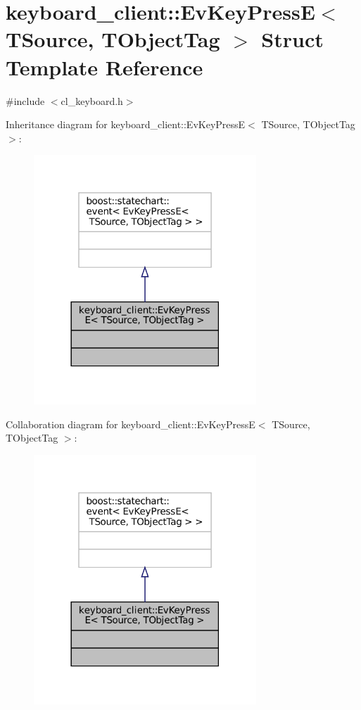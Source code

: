 \hypertarget{structkeyboard__client_1_1EvKeyPressE}{}\section{keyboard\+\_\+client\+:\+:Ev\+Key\+PressE$<$ T\+Source, T\+Object\+Tag $>$ Struct Template Reference}
\label{structkeyboard__client_1_1EvKeyPressE}


{\ttfamily \#include $<$cl\+\_\+keyboard.\+h$>$}



Inheritance diagram for keyboard\+\_\+client\+:\+:Ev\+Key\+PressE$<$ T\+Source, T\+Object\+Tag $>$\+:
\nopagebreak
\begin{figure}[H]
\begin{center}
\leavevmode
\includegraphics[width=237pt]{structkeyboard__client_1_1EvKeyPressE__inherit__graph}
\end{center}
\end{figure}


Collaboration diagram for keyboard\+\_\+client\+:\+:Ev\+Key\+PressE$<$ T\+Source, T\+Object\+Tag $>$\+:
\nopagebreak
\begin{figure}[H]
\begin{center}
\leavevmode
\includegraphics[width=237pt]{structkeyboard__client_1_1EvKeyPressE__coll__graph}
\end{center}
\end{figure}


